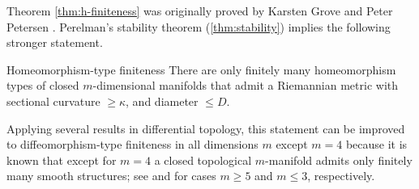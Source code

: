 Theorem \ref{thm:h-finiteness} was originally proved by Karsten Grove and Peter Petersen \cite{grove-petersen1988}.
Perelman's stability theorem (\ref{thm:stability}) implies the following stronger statement.

\begin{thm}{Homeomorphism-type finiteness}
There are only finitely many homeomorphism types of closed $m$-dimensional manifolds that admit a Riemannian metric with sectional curvature $\ge \kappa$, and diameter $\le D$.
\end{thm}

Applying several results in differential topology, this statement can be improved to diffeomorphism-type finiteness in all dimensions $m$ except $m=4$ because it is known that except for $m=4$ a closed topological $m$-manifold admits only finitely many smooth structures; see \cite{kirby-siebenmann} and  \cite{moise,thurston} for cases $m\ge 5$ and $m\le 3$, respectively.


